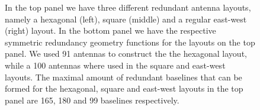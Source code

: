 \documentclass[useAMS,usenatbib]{mn2e}
\begin{document}
\begin{figure}
\caption{In the top panel we have three different redundant antenna layouts, namely a hexagonal (left), square (middle) and a regular east-west (right) layout. 
In the bottom panel we have the respective symmetric redundancy geometry functions for the layouts on the top panel. We used 91 antennas
to construct the the hexagonal layout, while a 100 antennas where used in the square and east-west layouts. The maximal amount of redundant baselines that can be formed for 
the hexagonal, square and east-west layouts in the top panel are 165, 180 and 99 baselines respectively.\label{fig:geometry_function}}
\end{figure}
\end{document}
